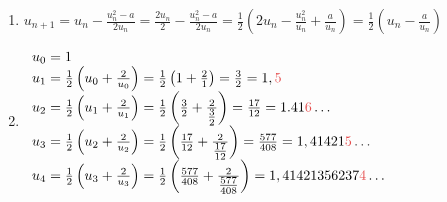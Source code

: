 \documentclass[11pt,a4paper,twoside]{report}
\begin{document}
\begin{enumerate}[label=R4.\arabic*, font=\bfseries, itemsep=8mm,labelsep*=4mm]
\begin{enumerate}[label=\roman*),itemsep=4mm]
\medskip
$x_3\in[7;8]$  $\imply \eh{2} x_3\simeq 7.8613$%
\item La fonction $g(x)=\sin^2(x)+\frac{x}{3}$  a un zéro évident en $x_0=0$. Geogebra montre qu'elle possède 2 autres zéros;

\medskip
$x_1\in[-3;-2]$  $\imply \eh{2} x_1\simeq -2.1369$%

\medskip
$x_2\in[-1;0]$  $\imply \eh{2} x_1\simeq -0.3470$%
\end{enumerate}

\bigskip
\textit{A noter que pour être certain d'avoir la précision désirée, il est nécessaire de fournir une décimale supplémentaire.}





\clearpage
\item $u_{n+1} = u_n - \frac{u_n^2-a}{2u_n}= \frac{2u_n}{2} - \frac{u_n^2-a}{2u_n} = \frac{1}{2}\left(2u_n - \frac{u_n^2}{u_n}+\frac{a}{u_n} \right)=\frac{1}{2}\left(u_n - \frac{a}{u_n}\right)$







\item
\renewcommand{\arraystretch}{2.5}
\begin{minipage}[t][][b]{1\textwidth}\vspace{-8.5mm}
$\everymath{\textstyle}\begin{array}{l}
  u_0 = 1     \\
  u_1 = \frac12 \left(u_0+\frac{2}{u_0}\right) = \frac12\left(1+\frac{2}{1}\right) = \frac{3}{2} = 1,\textcolor{red!60!lightgray}{5} \\
  u_2 = \frac12 \left(u_1+\frac{2}{u_1}\right) = \frac12\left(\tfrac{3}{2}+\frac{2}{\tfrac{3}{2}}\right)
  = \frac{17}{12} = 1.41\textcolor{red!60!lightgray}{6}\ldots \\
  u_3 = \frac12 \left(u_2+\frac{2}{u_2}\right) = \frac12\left(\tfrac{17}{12}+\frac{2}{\tfrac{17}{12}}\right) = \frac{577}{408} = 1,41421\textcolor{red!60!lightgray}{5} \ldots \\
  u_4 = \frac12 \left(u_3+\frac{2}{u_3}\right) = \frac12\left(\tfrac{577}{408}+\frac{2}{\tfrac{577}{408}}\right) = 1,41421356237\textcolor{red!60!lightgray}{4}\ldots
\end{array}\everymath{\displaystyle}$
\end{minipage} 


\end{enumerate}
\end{document}
